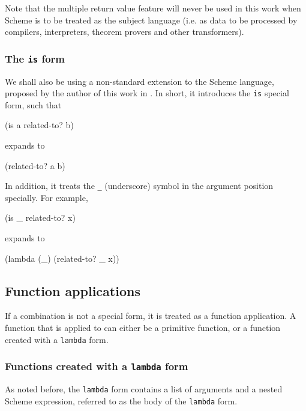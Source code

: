 Note that the multiple return value feature will never be used
in this work when Scheme is to be treated as the subject language
(i.e. as data to be processed by compilers, interpreters, theorem
provers and other transformers).

\subsubsection{The \texttt{is} form}

We shall also be using a non-standard extension to the Scheme language,
proposed by the author of this work in \cite{SRFI-156}. In short,
it introduces the \texttt{is} special form, such that

\begin{Snippet}
  (is a related-to? b)
\end{Snippet}

expands to

\begin{Snippet}
  (related-to? a b)
\end{Snippet}

In addition, it treats the \texttt{\_} (underscore) symbol in the argument
position specially. For example,

\begin{Snippet}
  (is _ related-to? x)
\end{Snippet}

expands to

\begin{Snippet}
  (lambda (_) (related-to? _ x))
\end{Snippet}

\subsection{Function applications}

If a combination is not a special form, it is treated as a function
application. A function that is applied to can either be a primitive
function, or a function created with a \texttt{lambda} form.

\subsubsection{Functions created with a \texttt{lambda} form}

As noted before, the \texttt{lambda} form contains a list of arguments
and a nested Scheme expression, referred to as the body of the
\texttt{lambda} form.

